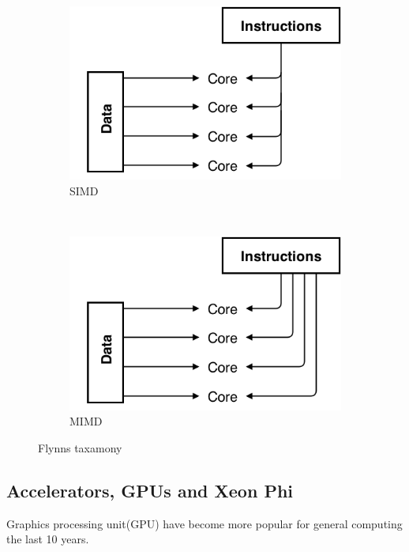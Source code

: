 \documentclass[10pt,a4paper]{report}
\begin{document}
\begin{figure}
        \begin{subfigure}[b]{0.4\textwidth}
                \includegraphics[width=\textwidth]{SIMD}
                \caption{SIMD}
                \label{fig:SIMD}
        \end{subfigure}
        ~
        \begin{subfigure}[b]{0.4\textwidth}
                \includegraphics[width=\textwidth]{MIMD}
                \caption{MIMD}
                \label{fig:MIMD}
        \end{subfigure}
        \caption{Flynns taxamony}\label{fig:flynn}
\end{figure}

\subsection{Accelerators, GPUs and Xeon Phi}
Graphics processing unit(GPU) have become more popular for general computing the last 10 years.
\end{document}
